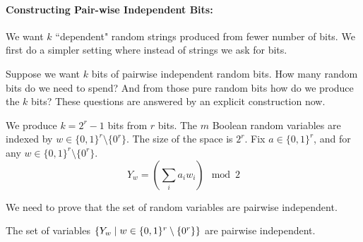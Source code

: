 \paragraph{Constructing Pair-wise Independent Bits:}
We want $k$ ``dependent" random strings produced from fewer number of bits. We first do a simpler setting where instead of strings we ask for bits.

Suppose we want $k$ bits of pairwise independent random bits. How many random bits do we need to spend? And from those pure random bits how do we produce the $k$ bits? These questions are answered by an explicit construction now.

\begin{definition}
\label{defn:pairwise-indep-bits}
We produce $k = 2^r - 1$ bits from $r$ bits. The $m$ Boolean random variables are indexed by $w \in \{0,1\}^r \setminus \{0^r\}$. The size of the space is $2^r$.
Fix $a \in \{0,1\}^r$, and for any $w \in \{0,1\}^r \setminus \{0^r\}$.
$$Y_w = ( \sum_i a_iw_i )\mod 2$$
\end{definition}
\noindent We need to prove that the set of random variables are pairwise independent.
\begin{claim}
The set of variables $\left\{ Y_w \mid w \in \{0,1\}^r \setminus \{0^r\} \right\}$ are pairwise independent.
\end{claim}
